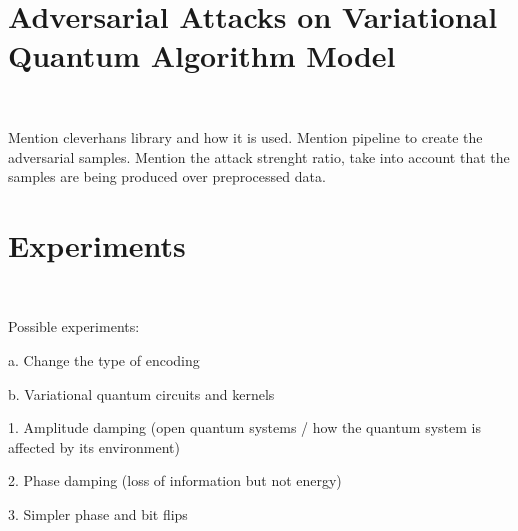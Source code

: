 \section{Adversarial Attacks on Variational Quantum Algorithm Model}\label{section:vqa_attacks} \

Mention cleverhans library and how it is used. Mention pipeline to create the adversarial samples. Mention the attack strenght ratio, take into account that the samples are being produced over preprocessed data.

\section{Experiments}\label{section:experiments} \

Possible experiments: \

a. Change the type of encoding \

b. Variational quantum circuits and kernels \

 1. Amplitude damping (open quantum systems / how the quantum system is affected by its environment) \

 2. Phase damping (loss of information but not energy) \

 3. Simpler phase and bit flips \